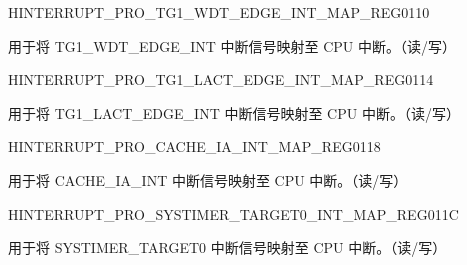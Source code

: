 \begin{register}{H}{INTERRUPT\_PRO\_TG1\_WDT\_EDGE\_INT\_MAP\_REG}{\hexprefix{}0110}\label{regdesc:INTERRUPTPROTG1WDTEDGEINTMAPREG}
%
%
\regnewline%
\begin{regdesc}\begin{reglist}
\label{fielddesc:INTERRUPTPROTG1WDTEDGEINTMAP}\item [INTERRUPT\_PRO\_TG1\_WDT\_EDGE\_INT\_MAP] 用于将 TG1\_WDT\_EDGE\_INT 中断信号映射至 CPU 中断。（读/写）
\end{reglist}\end{regdesc}
\end{register}


\begin{register}{H}{INTERRUPT\_PRO\_TG1\_LACT\_EDGE\_INT\_MAP\_REG}{\hexprefix{}0114}\label{regdesc:INTERRUPTPROTG1LACTEDGEINTMAPREG}
%
%
\regnewline%
\begin{regdesc}\begin{reglist}
\label{fielddesc:INTERRUPTPROTG1LACTEDGEINTMAP}\item [INTERRUPT\_PRO\_TG1\_LACT\_EDGE\_INT\_MAP] 用于将 TG1\_LACT\_EDGE\_INT 中断信号映射至 CPU 中断。（读/写）
\end{reglist}\end{regdesc}
\end{register}


\begin{register}{H}{INTERRUPT\_PRO\_CACHE\_IA\_INT\_MAP\_REG}{\hexprefix{}0118}\label{regdesc:INTERRUPTPROCACHEIAINTMAPREG}
%
%
\regnewline%
\begin{regdesc}\begin{reglist}
\label{fielddesc:INTERRUPTPROCACHEIAINTMAP}\item [INTERRUPT\_PRO\_CACHE\_IA\_INT\_MAP] 用于将 CACHE\_IA\_INT 中断信号映射至 CPU 中断。（读/写）
\end{reglist}\end{regdesc}
\end{register}


\begin{register}{H}{INTERRUPT\_PRO\_SYSTIMER\_TARGET0\_INT\_MAP\_REG}{\hexprefix{}011C}\label{regdesc:INTERRUPTPROSYSTIMERTARGET0INTMAPREG}
%
%
\regnewline%
\begin{regdesc}\begin{reglist}
\label{fielddesc:INTERRUPTPROSYSTIMERTARGET0INTMAP}\item [INTERRUPT\_PRO\_SYSTIMER\_TARGET0\_INT\_MAP] 用于将 SYSTIMER\_TARGET0 中断信号映射至 CPU 中断。（读/写）
\end{reglist}\end{regdesc}
\end{register}


